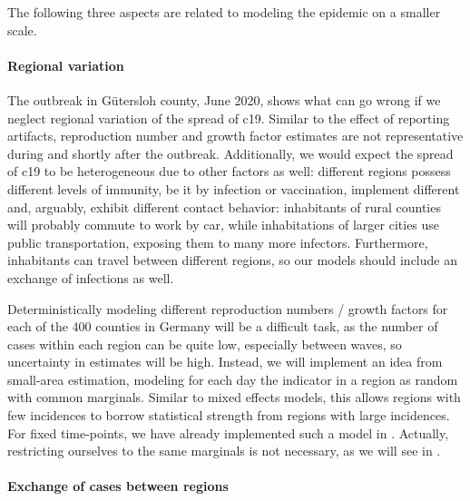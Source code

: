 The following three aspects are related to modeling the epidemic on a smaller scale. 

\paragraph{Regional variation}
The outbreak in Gütersloh county, June 2020, shows what can go wrong if we neglect regional variation of the spread of \acrshort{c19}. Similar to the effect of reporting artifacts, reproduction number and growth factor estimates are  not representative during and shortly after the outbreak. Additionally, we would expect the spread of \acrshort{c19} to be heterogeneous due to other factors as well: different regions possess different levels of immunity, be it by infection or vaccination, implement different  and, arguably, exhibit different contact behavior: inhabitants of rural counties will probably commute to work by car, while inhabitations of larger cities use public transportation, exposing them to many more infectors. Furthermore, inhabitants can travel between different regions, so our models should include an exchange of infections as well. 

Deterministically modeling different reproduction numbers / growth factors for each of the 400 counties in Germany will be a difficult task, as the number of cases within each region can be quite low, especially between waves, so uncertainty in estimates will be high. Instead, we will implement an idea from small-area estimation, modeling for each day the indicator in a region as random with common marginals. Similar to mixed effects models, this allows regions with few incidences to \glqq{}borrow statistical strength\grqq{} from regions with large incidences. For fixed time-points, we have already implemented such a model in \citep{Burgard2021Regional}. Actually, restricting ourselves to the same marginals is not necessary, as we will see in . 

\paragraph{Exchange of cases between regions}

